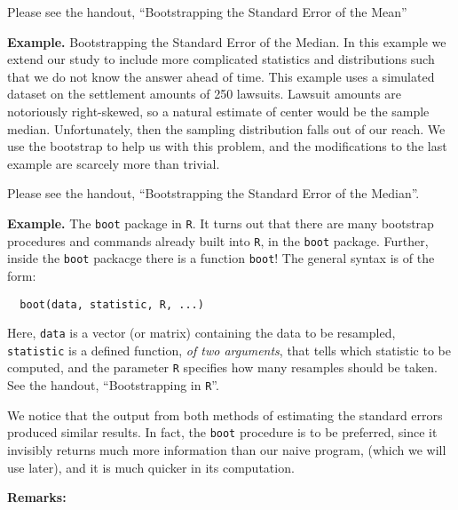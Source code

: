 \documentclass[captions=tableheading]{scrbook}
\begin{document}
 

Please see the handout, ``Bootstrapping the Standard Error of the Mean''  


 
\textbf{Example.} Bootstrapping the Standard Error of the Median. In this example we extend our study to include more complicated statistics and distributions such that we do not know the answer ahead of time. This example uses a simulated dataset on the settlement amounts of 250 lawsuits. Lawsuit amounts are notoriously right-skewed, so a natural estimate of center would be the sample median. Unfortunately, then the sampling distribution falls out of our reach. We use the bootstrap to help us with this problem, and the modifications to the last example are scarcely more than trivial.

 

Please see the handout, ``Bootstrapping the Standard Error of the Median''.  


 

\textbf{Example.} The \texttt{boot} package in \texttt{R}. It turns out that there are many bootstrap procedures and commands already built into \texttt{R}, in the \texttt{boot} package. Further, inside the \texttt{boot} packacge there is a function \texttt{boot}! The general syntax is of the form:

\begin{verbatim}
  boot(data, statistic, R, ...)
\end{verbatim}


Here, \texttt{data} is a vector (or matrix) containing the data to be resampled, \texttt{statistic} is a defined function, \emph{of two arguments}, that tells which statistic to be computed, and the parameter \texttt{R} specifies how many resamples should be taken. See the handout, ``Bootstrapping in \texttt{R}''.

 

We notice that the output from both methods of estimating the standard errors produced similar results. In fact, the \texttt{boot} procedure is to be preferred, since it invisibly returns much more information than our naive program, (which we will use later), and it is much quicker in its computation.  


\textbf{Remarks:}
\end{document}
